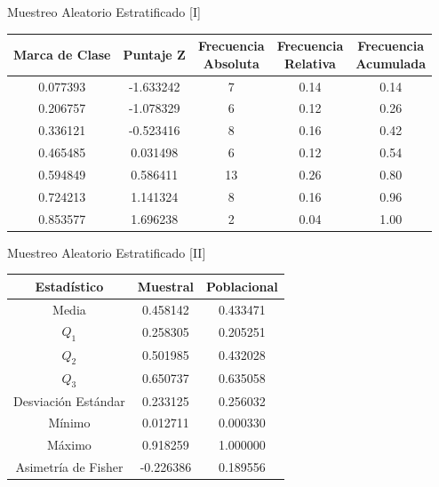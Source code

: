 \documentclass{beamer}
\begin{document}
    \begin{frame}{Muestreo Aleatorio Estratificado [I]}
        \begin{center}
            \begin{tabular}{|c|c|c|c|c|}
                \hline
                Marca de Clase & Puntaje Z & \makecell{Frecuencia\\Absoluta} & \makecell{Frecuencia\\Relativa} & \makecell{Frecuencia\\Acumulada} \\
                \hline
                0.077393 & -1.633242 & 7  & 0.14 & 0.14 \\
                0.206757 & -1.078329 & 6  & 0.12 & 0.26 \\
                0.336121 & -0.523416 & 8  & 0.16 & 0.42 \\
                0.465485 & 0.031498  & 6  & 0.12 & 0.54 \\
                0.594849 & 0.586411  & 13 & 0.26 & 0.80 \\
                0.724213 & 1.141324  & 8  & 0.16 & 0.96 \\
                0.853577 & 1.696238  & 2  & 0.04 & 1.00 \\
                \hline
            \end{tabular}
        \end{center}
    \end{frame}

    \begin{frame}{Muestreo Aleatorio Estratificado [II]}
        \begin{center}
            \begin{tabular}{|c|cc|}
                \hline
                Estadístico & Muestral & Poblacional \\
                \hline
                Media & 0.458142  & 0.433471 \\
                $Q_1$ & 0.258305 & 0.205251 \\
                $Q_2$ & 0.501985 & 0.432028 \\
                $Q_3$ & 0.650737 & 0.635058 \\
                Desviación Estándar & 0.233125 & 0.256032 \\
                Mínimo & 0.012711 & 0.000330 \\
                Máximo & 0.918259 & 1.000000 \\
                Asimetría de Fisher & -0.226386 & 0.189556 \\
                \hline
            \end{tabular}
        \end{center}
    \end{frame}
\end{document}
